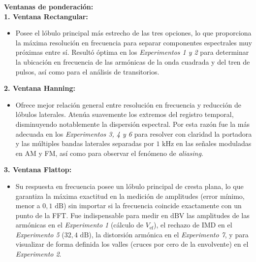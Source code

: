 \vspace{0.5cm}

\begin{centering}
\textbf{Ventanas de ponderación:}\\
\textbf{1. Ventana Rectangular:}

\begin{itemize}
    \item Posee el lóbulo principal más estrecho de las tres opciones, lo que proporciona la máxima resolución en frecuencia para separar componentes espectrales muy próximas entre sí. Resultó óptima en los \textit{Experimentos 1 y 2} para determinar la ubicación en frecuencia de las armónicas de la onda cuadrada y del tren de pulsos, así como para el análisis de transitorios.
\end{itemize}

\textbf{2. Ventana Hanning:}
\begin{itemize}
    \item Ofrece mejor relación general entre resolución en frecuencia y reducción de lóbulos laterales. Atenúa suavemente los extremos del registro temporal, disminuyendo notablemente la dispersión espectral. Por esta razón fue la más adecuada en los \textit{Experimentos 3, 4 y 6} para resolver con claridad la portadora y las múltiples bandas laterales separadas por $1\text{ kHz}$ en las señales moduladas en AM y FM, así como para observar el fenómeno de \textit{aliasing}.
\end{itemize}

\textbf{3. Ventana Flattop:}
\begin{itemize}
    \item Su respuesta en frecuencia posee un lóbulo principal de cresta plana, lo que garantiza la máxima exactitud en la medición de amplitudes (error mínimo, menor a $0,1\text{ dB}$) sin importar si la frecuencia coincide exactamente con un punto de la FFT. Fue indispensable para medir en $\text{dBV}$ las amplitudes de las armónicas en el \textit{Experimento 1} (cálculo de $V_{\text{ef}}$), el rechazo de IMD en el \textit{Experimento 5} ($32,4\text{ dB}$), la distorsión armónica en el \textit{Experimento 7}, y para visualizar de forma definida los valles (cruces por cero de la envolvente) en el \textit{Experimento 2}.\\
    \end{itemize}
    \end{centering}
\vspace{0.7cm}
